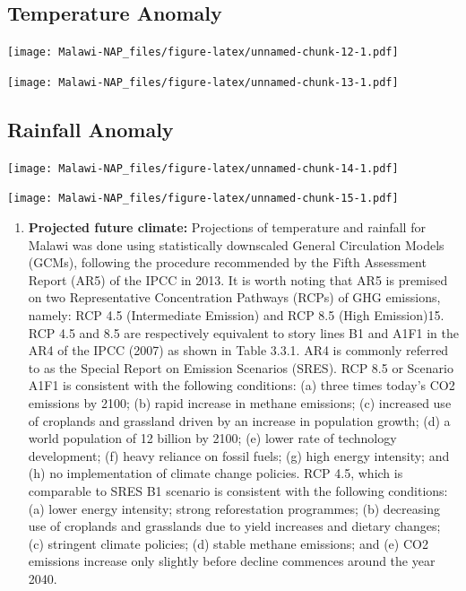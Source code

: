 \documentclass[
]{book}
\providecommand{\tightlist}{%
  \setlength{\itemsep}{0pt}\setlength{\parskip}{0pt}}
\begin{document}
\hypertarget{temperature-anomaly}{%
\subsection{Temperature Anomaly}\label{temperature-anomaly}}

\texttt{[image: Malawi-NAP\_files/figure-latex/unnamed-chunk-12-1.pdf]}

\texttt{[image: Malawi-NAP\_files/figure-latex/unnamed-chunk-13-1.pdf]}

\hypertarget{rainfall-anomaly}{%
\subsection{Rainfall Anomaly}\label{rainfall-anomaly}}

\texttt{[image: Malawi-NAP\_files/figure-latex/unnamed-chunk-14-1.pdf]}

\texttt{[image: Malawi-NAP\_files/figure-latex/unnamed-chunk-15-1.pdf]}

\begin{enumerate}
\def\labelenumi{\arabic{enumi}.}
\setcounter{enumi}{50}
\tightlist
\item
  \textbf{Projected future climate:} Projections of temperature and rainfall for Malawi was done using statistically downscaled General Circulation Models (GCMs), following the procedure recommended by the Fifth Assessment Report (AR5) of the IPCC in 2013. It is worth noting that AR5 is premised on two Representative Concentration Pathways (RCPs) of GHG emissions, namely: RCP 4.5 (Intermediate Emission) and RCP 8.5 (High Emission)15. RCP 4.5 and 8.5 are respectively equivalent to story lines B1 and A1F1 in the AR4 of the IPCC (2007) as shown in Table 3.3.1. AR4 is commonly referred to as the Special Report on Emission Scenarios (SRES). RCP 8.5 or Scenario A1F1 is consistent with the following conditions: (a) three times today's CO2 emissions by 2100; (b) rapid increase in methane emissions; (c) increased use of croplands and grassland driven by an increase in population growth; (d) a world population of 12 billion by 2100; (e) lower rate of technology development; (f) heavy reliance on fossil fuels; (g) high energy intensity; and (h) no implementation of climate change policies. RCP 4.5, which is comparable to SRES B1 scenario is consistent with the following conditions: (a) lower energy intensity; strong reforestation programmes; (b) decreasing use of croplands and grasslands due to yield increases and dietary changes; (c) stringent climate policies; (d) stable methane emissions; and (e) CO2 emissions increase only slightly before decline commences around the year 2040.
\end{enumerate}
\end{document}
